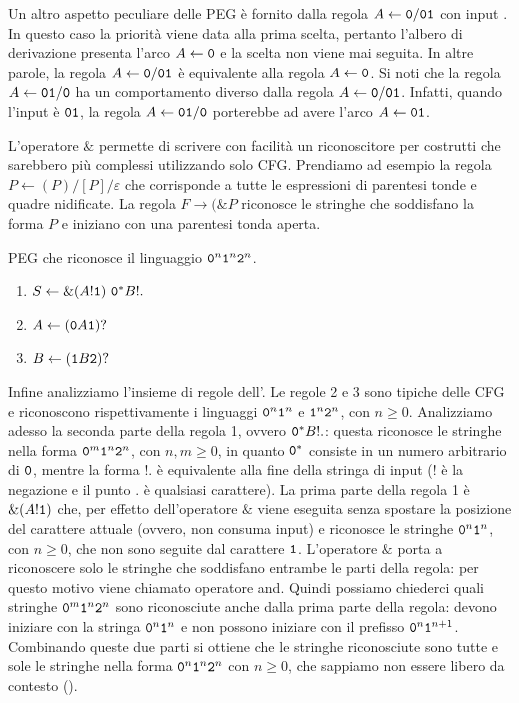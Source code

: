Un altro aspetto peculiare delle PEG è fornito dalla regola $A \gets \mathtt{0} / \mathtt{0}\mathtt{1}$ con input \zero\uno.
In questo caso la priorità viene data alla prima scelta, pertanto l'albero di derivazione presenta l'arco $A \gets \mathtt{0}$
e la scelta \zero\uno non viene mai seguita.
In altre parole, la regola $A \gets \mathtt{0} / \mathtt{0}\mathtt{1}$ è equivalente alla regola $A \gets \mathtt{0}$.
Si noti che la regola $A \gets \mathtt{0}\mathtt{1} / \mathtt{0}$ ha un comportamento diverso dalla regola $A \gets \mathtt{0} / \mathtt{0}\mathtt{1}$.
Infatti, quando l'input è $\mathtt{0}\mathtt{1}$, la regola $A \gets \mathtt{0}\mathtt{1} / \mathtt{0}$ porterebbe ad avere l'arco $A \gets \mathtt{0}\mathtt{1}$.

L'operatore $\&$ permette di scrivere con facilità un riconoscitore per costrutti che sarebbero più complessi
utilizzando solo CFG.
Prendiamo ad esempio la regola $P \gets (P) / [P] / \varepsilon$ che corrisponde a tutte le espressioni di parentesi tonde
e quadre nidificate.
La regola $F\to ( \& P$ riconosce le stringhe che soddisfano la forma $P$ e iniziano con una parentesi tonda aperta.


\begin{example}\label{exa:peg-no-cfg}
PEG che riconosce il linguaggio $\mathtt{0}^{n}\mathtt{1}^{n}\mathtt{2}^{n}$.
\begin{enumerate}
\item $S \gets \&(A !\mathtt{1})\ \mathtt{0}{}^{\ast} B !.$
\item $A \gets (\mathtt{0} A \mathtt{1})?$
\item $B \gets (\mathtt{1} B \mathtt{2})?$
\end{enumerate}
\end{example}


Infine analizziamo l'insieme di regole dell'.
Le regole 2 e 3 sono tipiche delle CFG e riconoscono rispettivamente i linguaggi $\mathtt{0}^{n}\mathtt{1}^{n}$ e
$\mathtt{1}^{n}\mathtt{2}^{n}$, con $n\ge 0$.
Analizziamo adesso la seconda parte della regola 1, ovvero $\mathtt{0}{}^{\ast} B !.$: questa riconosce le stringhe nella forma
$\mathtt{0}^{m}\mathtt{1}^{n}\mathtt{2}^{n}$, con $n,m \ge 0$, in quanto $\mathtt{0}{}^{\ast}$ consiste in un numero arbitrario di $\mathtt{0}$,
mentre la forma $!.$ è equivalente alla fine della stringa di input ($!$ è la negazione e il punto $.$ è qualsiasi carattere).
La prima parte della regola 1 è $\&(A !\mathtt{1})$ che, per effetto dell'operatore $\&$ viene eseguita senza spostare la
posizione del carattere attuale (ovvero, non consuma input) e riconosce le stringhe $\mathtt{0}^{n}\mathtt{1}^{n}$, con $n\ge 0$, che
non sono seguite dal carattere $\mathtt{1}$.
L'operatore $\&$ porta a riconoscere solo le stringhe che soddisfano entrambe le parti della regola: per questo motivo
viene chiamato operatore \textsf{and}.
Quindi possiamo chiederci quali stringhe $\mathtt{0}^{m}\mathtt{1}^{n}\mathtt{2}^{n}$ sono riconosciute anche dalla prima parte della
regola: devono iniziare con la stringa $\mathtt{0}^{n}\mathtt{1}^{n}$ e non possono iniziare con il prefisso $\mathtt{0}^{n}\mathtt{1}^{n+1}$.
Combinando queste due parti si ottiene che le stringhe riconosciute sono tutte e sole le stringhe nella forma
$\mathtt{0}^{n}\mathtt{1}^{n}\mathtt{2}^{n}$ con $n\ge 0$, che sappiamo non essere libero da contesto ().

